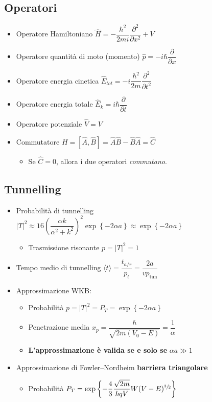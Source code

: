 \documentclass{article}
\begin{document}
\subsection{Operatori}
\begin{itemize}
  \item Operatore Hamiltoniano \( \hat{H} = - \dfrac{\hbar ^ 2}{2mi} \dfrac{\partial ^ 2}{\partial x ^ 2} + V \)
  \item Operatore quantità di moto (momento) \( \hat{p} = -i \hbar \dfrac{\partial}{\partial x} \)
  \item Operatore energia cinetica \( \hat{E}_{tot} = -i \dfrac{\hbar ^ 2}{2m} \dfrac{\partial ^ 2}{\partial t ^ 2} \)
  \item Operatore energia totale \( \hat{E}_k = i \hbar \dfrac{\partial }{\partial t} \)
  \item Operatore potenziale \( \hat{V} = V \)
  \item Commutatore \( H = [\hat{A}, \hat{B}] = \hat{A}\hat{B} - \hat{B}\hat{A} = \hat{C} \)
        \begin{itemize}
          \item Se \( \hat{C} = 0 \), allora i due operatori \textit{commutano}.
        \end{itemize}
\end{itemize}

\subsection{Tunnelling}
\begin{itemize}
  \item Probabilità di tunnelling \( \left| T \right| ^ 2 \approx 16 \left( \dfrac{\alpha k}{\alpha^2 + k^2} \right) ^ 2  \exp{ \left\{ -2 \alpha a \right\} } \approx \exp{\left\{-2 \alpha a\right\}} \)
        \begin{itemize}
          \item Trasmissione risonante \( p = |  T | ^ 2 = 1 \)
        \end{itemize}
  \item Tempo medio di tunnelling \( \langle t \rangle = \dfrac{t_{a/r}}{p_t} = \dfrac{2 a}{v p_{\text{tun}}} \)
  \item Approssimazione WKB:
        \begin{itemize}
          \item Probabilità \( p = \left| T \right| ^ 2 = P_T = \exp{ \left\{ -2 \alpha a \right\} } \)
          \item Penetrazione media \( x_p = \dfrac{\hbar}{\sqrt{2 m (V_0 - E)}} = \dfrac{1}{\alpha} \)
          \item \textbf{L'approssimazione è valida se e solo se} \( \alpha a \gg 1 \)
        \end{itemize}
  \item Approssimazione di Fowler–Nordheim \textbf{barriera triangolare}
        \begin{itemize}
          \item Probabilità \( P_T = \exp\left\{ - \dfrac{4}{3} \dfrac{\sqrt{2m}}{\hbar q V} W (V - E) ^ {\sfrac{3}{2}} \right\} \)
        \end{itemize}
\end{itemize}
\end{document}
